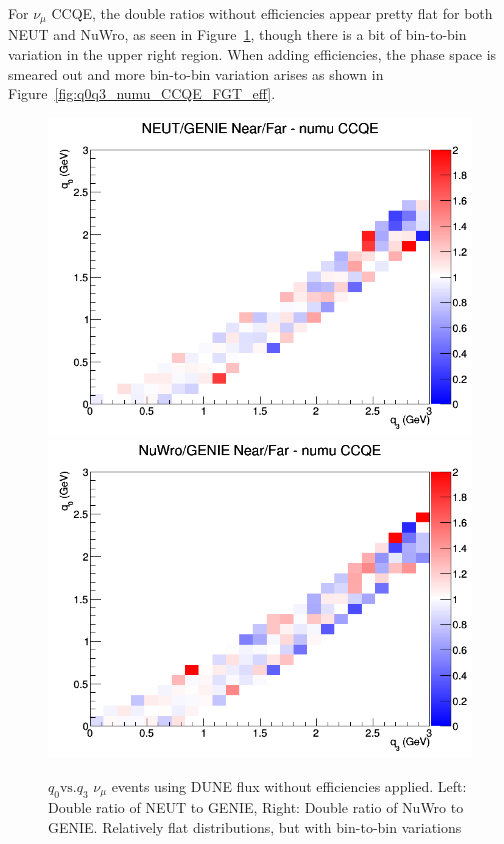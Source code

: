 \documentclass[12pt]{article}
\begin{document}
For $\nu_{\mu}$ CCQE, the double ratios without efficiencies appear pretty flat for both NEUT and NuWro, as seen in Figure~\ref{fig:q0q3_numu_CCQE_no_eff}, though there is a bit of bin-to-bin variation in the upper right region. When adding efficiencies, the phase space is smeared out and  more bin-to-bin variation arises as shown in Figure~\ref{fig:q0q3_numu_CCQE_FGT_eff}.
\begin{figure}[h]
\centering
{}
\includegraphics[width=\linewidth]{q0_q3/nominal/ratios/CCQE_NEUT_GENIE_numu_NF_q3_q0.png}
\endminipage
{}
\includegraphics[width=\linewidth]{q0_q3/nominal/ratios/CCQE_NuWro_GENIE_numu_NF_q3_q0.png}
\endminipage
\caption{$q_0 \textrm{vs.} q_3$ $\nu_{\mu}$ events using DUNE flux without efficiencies applied. Left: Double ratio of NEUT to GENIE, Right: Double ratio of NuWro to GENIE. Relatively flat distributions, but with bin-to-bin variations}
\label{fig:q0q3_numu_CCQE_no_eff}
\end{figure}
\end{document}

